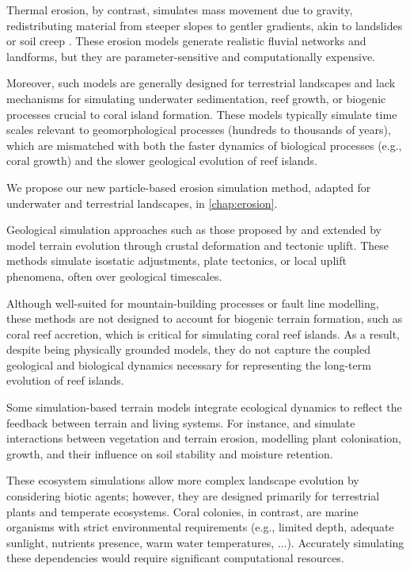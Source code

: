 Thermal erosion, by contrast, simulates mass movement due to gravity, redistributing material from steeper slopes to gentler gradients, akin to landslides or soil creep \cite{Benes2006}. These erosion models generate realistic fluvial networks and landforms, but they are parameter-sensitive and computationally expensive.

Moreover, such models are generally designed for terrestrial landscapes and lack mechanisms for simulating underwater sedimentation, reef growth, or biogenic processes crucial to coral island formation. These models typically simulate time scales relevant to geomorphological processes (hundreds to thousands of years), which are mismatched with both the faster dynamics of biological processes (e.g., coral growth) and the slower geological evolution of reef islands.

We propose our new particle-based erosion simulation method, adapted for underwater and terrestrial landscapes, in \cref{chap:erosion}.


Geological simulation approaches such as those proposed by \cite{Cordonnier2016, Cordonnier2017a} and extended by \cite{Schott2023} model terrain evolution through crustal deformation and tectonic uplift. These methods simulate isostatic adjustments, plate tectonics, or local uplift phenomena, often over geological timescales.

Although well-suited for mountain-building processes or fault line modelling, these methods are not designed to account for biogenic terrain formation, such as coral reef accretion, which is critical for simulating coral reef islands. As a result, despite being physically grounded models, they do not capture the coupled geological and biological dynamics necessary for representing the long-term evolution of reef islands.


Some simulation-based terrain models integrate ecological dynamics to reflect the feedback between terrain and living systems. For instance, \cite{Ecormier-Nocca2021} and \cite{Cordonnier2017b} simulate interactions between vegetation and terrain erosion, modelling plant colonisation, growth, and their influence on soil stability and moisture retention.

These ecosystem simulations allow more complex landscape evolution by considering biotic agents; however, they are designed primarily for terrestrial plants and temperate ecosystems. Coral colonies, in contrast, are marine organisms with strict environmental requirements (e.g., limited depth, adequate sunlight, nutrients presence, warm water temperatures, ...). Accurately simulating these dependencies would require significant computational resources.

